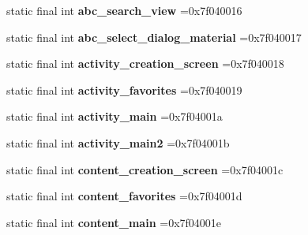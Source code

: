 \begin{DoxyCompactItemize}
\item 
\hypertarget{classcheck_1_1test_1_1_r_1_1layout_ae3f61b1ac3c1d29e959894d24f917deb}{}static final int {\bfseries abc\+\_\+search\+\_\+view} =0x7f040016\label{classcheck_1_1test_1_1_r_1_1layout_ae3f61b1ac3c1d29e959894d24f917deb}

\item 
\hypertarget{classcheck_1_1test_1_1_r_1_1layout_a8ff2283cb2a803cefe607c9e9276b728}{}static final int {\bfseries abc\+\_\+select\+\_\+dialog\+\_\+material} =0x7f040017\label{classcheck_1_1test_1_1_r_1_1layout_a8ff2283cb2a803cefe607c9e9276b728}

\item 
\hypertarget{classcheck_1_1test_1_1_r_1_1layout_a063d7f23adcc86ea7ffd68a40e1d70b1}{}static final int {\bfseries activity\+\_\+creation\+\_\+screen} =0x7f040018\label{classcheck_1_1test_1_1_r_1_1layout_a063d7f23adcc86ea7ffd68a40e1d70b1}

\item 
\hypertarget{classcheck_1_1test_1_1_r_1_1layout_a44096e72a2527e673d9605c949cc73cd}{}static final int {\bfseries activity\+\_\+favorites} =0x7f040019\label{classcheck_1_1test_1_1_r_1_1layout_a44096e72a2527e673d9605c949cc73cd}

\item 
\hypertarget{classcheck_1_1test_1_1_r_1_1layout_a8de1b0f1db4292417ee244412dd3e25a}{}static final int {\bfseries activity\+\_\+main} =0x7f04001a\label{classcheck_1_1test_1_1_r_1_1layout_a8de1b0f1db4292417ee244412dd3e25a}

\item 
\hypertarget{classcheck_1_1test_1_1_r_1_1layout_a6d68bef2b3e77db82615cb93adcaf84d}{}static final int {\bfseries activity\+\_\+main2} =0x7f04001b\label{classcheck_1_1test_1_1_r_1_1layout_a6d68bef2b3e77db82615cb93adcaf84d}

\item 
\hypertarget{classcheck_1_1test_1_1_r_1_1layout_a09803b49bc3914e3115aa4d189acfdfc}{}static final int {\bfseries content\+\_\+creation\+\_\+screen} =0x7f04001c\label{classcheck_1_1test_1_1_r_1_1layout_a09803b49bc3914e3115aa4d189acfdfc}

\item 
\hypertarget{classcheck_1_1test_1_1_r_1_1layout_a06c29b2f98cf4011a46f5385b544e9d2}{}static final int {\bfseries content\+\_\+favorites} =0x7f04001d\label{classcheck_1_1test_1_1_r_1_1layout_a06c29b2f98cf4011a46f5385b544e9d2}

\item 
\hypertarget{classcheck_1_1test_1_1_r_1_1layout_a8baea0d5d5ed352fbf8a5f7b907906d7}{}static final int {\bfseries content\+\_\+main} =0x7f04001e\label{classcheck_1_1test_1_1_r_1_1layout_a8baea0d5d5ed352fbf8a5f7b907906d7}


\end{DoxyCompactItemize}
